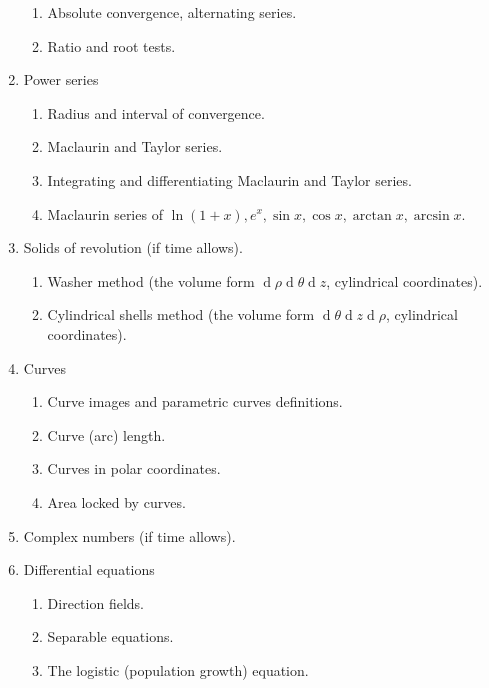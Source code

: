 \documentclass{article}
\begin{document}
\begin{enumerate}
\begin{enumerate}
\item Absolute convergence, alternating series.
\item Ratio and root tests.
\end{enumerate}
\item Power series
\begin{enumerate}
\item Radius and interval of convergence.
\item Maclaurin and Taylor series.
\item Integrating and differentiating Maclaurin and Taylor series. 
\item Maclaurin series of $\ln(1+x), e^x, \sin x, \cos x, \arctan x, \arcsin x$.
\end{enumerate}
\item Solids of revolution (if time allows).
\begin{enumerate}
\item Washer method (the volume form $\operatorname{d}\rho \operatorname{d}\theta \operatorname{d} z$, cylindrical coordinates).
\item Cylindrical shells method (the volume form $ \operatorname{d}\theta \operatorname{d} z \operatorname{d}\rho$, cylindrical coordinates).
\end{enumerate}
\item Curves
\begin{enumerate}
\item Curve images and parametric curves definitions.
\item Curve (arc) length.
\item Curves in polar coordinates.
\item Area locked by curves.
\end{enumerate}
\item Complex numbers (if time allows).
\item Differential equations
\begin{enumerate}
\item Direction fields.
\item Separable equations.
\item The logistic (population growth) equation.
\end{enumerate}

\end{enumerate}
\end{document}
